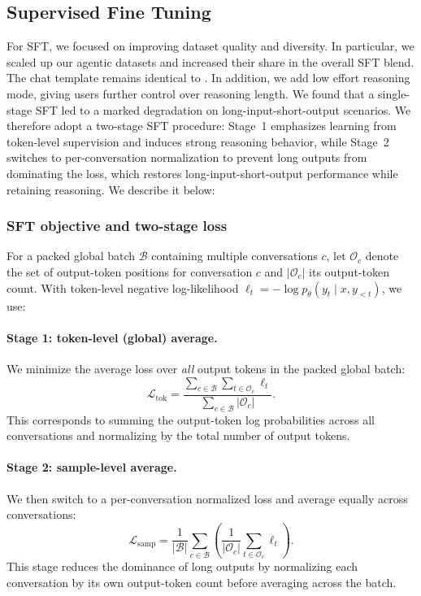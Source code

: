 \subsection{Supervised Fine Tuning}
\label{subsec:SFT}
For \ourmodel SFT, we focused on improving dataset quality and diversity. In particular, we scaled up our agentic datasets and increased their share in the overall SFT blend. The chat template remains identical to \nanomodel. In addition, we add low effort reasoning mode, giving users further control over reasoning length. We found that a single-stage SFT led to a marked degradation on long-input-short-output scenarios. We therefore adopt a two-stage SFT procedure: Stage~1 emphasizes learning from token-level supervision and induces strong reasoning behavior, while Stage~2 switches to per-conversation normalization to prevent long outputs from dominating the loss, which restores long-input-short-output performance while retaining reasoning. We describe it below:

\subsubsection*{SFT objective and two-stage loss}

For a packed global batch $\mathcal{B}$ containing multiple conversations $c$, let $\mathcal{O}_c$ denote the set of output-token positions for conversation $c$ and $|\mathcal{O}_c|$ its output-token count. With token-level negative log-likelihood $\ell_t = -\log p_\theta(y_t \mid x, y_{<t})$, we use:

\paragraph{Stage 1: token-level (global) average.}
We minimize the average loss over \emph{all} output tokens in the packed global batch:
\begin{equation}
\mathcal{L}_{\text{tok}}
= \frac{\sum\limits_{c \in \mathcal{B}} \sum\limits_{t \in \mathcal{O}_c} \ell_t}
{\sum\limits_{c \in \mathcal{B}} |\mathcal{O}_c|}.
\end{equation}
This corresponds to summing the output-token log probabilities across all conversations and normalizing by the total number of output tokens.


\paragraph{Stage 2: sample-level average.}
We then switch to a per-conversation normalized loss and average equally across conversations:
\begin{equation}
\mathcal{L}_{\text{samp}}
= \frac{1}{|\mathcal{B}|} \sum\limits_{c \in \mathcal{B}}
\left(
\frac{1}{|\mathcal{O}_c|} \sum\limits_{t \in \mathcal{O}_c} \ell_t
\right).
\end{equation}
This stage reduces the dominance of long outputs by normalizing each conversation by its own output-token count before averaging across the batch.

